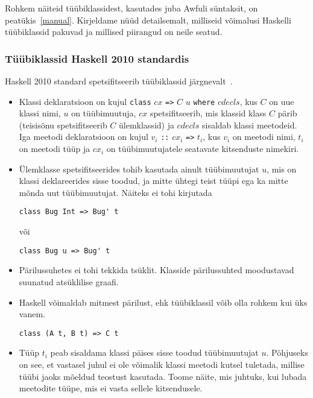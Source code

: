 \documentclass[12pt]{article}
\begin{document}
      Rohkem näiteid tüübiklassidest, kasutades juba Awfuli süntaksit, on peatükis~\ref{manual}. Kirjeldame nüüd detailsemalt, milliseid võimalusi Haskelli tüübiklassid pakuvad ja millised piirangud on neile seatud.
      \subsubsection{Tüübiklassid Haskell 2010 standardis}\label{haskstd}
        Haskell 2010 standard spetsifitseerib tüübiklassid järgnevalt~\cite{Has}.
        \begin{itemize}
          \item
            Klassi deklaratsioon on kujul \verb!class! $cx$ \verb!=>! $C$ $u$ \verb!where! $cdecls$, kus $C$ on uue klassi nimi, $u$ on tüübimuutuja, $cx$ spetsifitseerib, mis klassid klass $C$ pärib (teisisõnu spetsifitseerib $C$ ülemklassid) ja $cdecls$ sisaldab klassi meetodeid. Iga meetodi deklaratsioon on kujul $v_i$ \verb!::! $cx_i$ \verb!=>! $t_i$, kus $v_i$ on meetodi nimi, $t_i$ on meetodi tüüp ja $cx_i$ on tüübimuutujatele seatavate kitsenduste nimekiri.
          \item
            Ülemklasse spetsifitseerides tohib kasutada ainult tüübimuutujat $u$, mis on klassi deklareerides sisse toodud, ja mitte ühtegi teist tüüpi ega ka mitte mõnda uut tüübimuutujat. Näiteks ei tohi kirjutada

            \begin{verbatim}class Bug Int => Bug' t\end{verbatim}

            või

            \begin{verbatim}class Bug u => Bug' t\end{verbatim}
          \item
            Pärilussuhetes ei tohi tekkida tsüklit. Klasside pärilussuhted moodustavad suunatud atsüklilise graafi.
          \item
            Haskell võimaldab mitmest pärilust, ehk tüübiklassil võib olla rohkem kui üks vanem.

            \begin{verbatim}class (A t, B t) => C t\end{verbatim}
          \item
            Tüüp $t_i$ peab sisaldama klassi päises sisse toodud tüübimuutujat $u$. Põhjuseks on see, et vastasel juhul ei ole võimalik klassi meetodi kutsel tuletada, millise tüübi jaoks mõeldud teostust kasutada. Toome näite, mis juhtuks, kui lubada meetodite tüüpe, mis ei vasta sellele kitsendusele.


\end{itemize}
\end{document}
